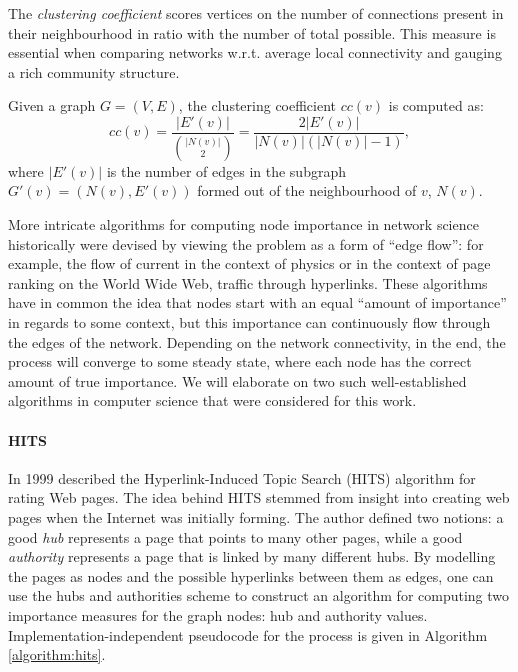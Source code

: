 The \emph{clustering coefficient} scores vertices on the number of connections present in their neighbourhood in ratio with the number of total possible. This measure is essential when comparing networks w.r.t. average local connectivity and gauging a rich community structure.

\begin{definition}
Given a graph $G=(V, E)$, the clustering coefficient $cc(v)$ is computed as: \begin{equation}
cc(v)=\frac{|E'(v)|}{{|N(v)| \choose 2}} = \frac{2|E'(v)|}{|N(v)|(|N(v)|-1)},\end{equation}
where $|E'(v)|$ is the number of edges in the subgraph $G'(v)=(N(v), E'(v))$ formed out of the neighbourhood of $v$, $N(v)$.
\end{definition}

More intricate algorithms for computing node importance in network science historically were devised by viewing the problem as a form of \enquote{edge flow}: for example, the flow of current in the context of physics or in the context of page ranking on the World Wide Web, traffic through hyperlinks. These algorithms have in common the idea that nodes start with an equal \enquote{amount of importance} in regards to some context, but this importance can continuously flow through the edges of the network. Depending on the network connectivity, in the end, the process will converge to some steady state, where each node has the correct amount of true importance. We will elaborate on two such well-established algorithms in computer science that were considered for this work.

\paragraph{HITS} In 1999 \cite{kleinberg_authoritative_1999} described the Hyperlink-Induced Topic Search (HITS) algorithm for rating Web pages. The idea behind HITS stemmed from insight into creating web pages when the Internet was initially forming. The author defined two notions: a good \emph{hub} represents a page that points to many other pages, while a good \emph{authority} represents a page that is linked by many different hubs. By modelling the pages as nodes and the possible hyperlinks between them as edges, one can use the hubs and authorities scheme to construct an algorithm for computing two importance measures for the graph nodes: hub and authority values. Implementation-independent pseudocode for the process is given in Algorithm \ref{algorithm:hits}.

